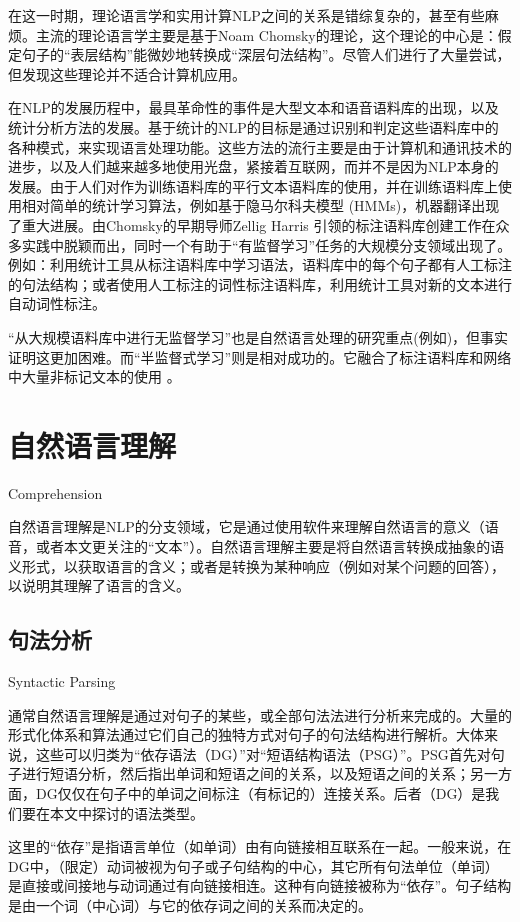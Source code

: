 在这一时期，理论语言学和实用计算NLP之间的关系是错综复杂的，甚至有些麻烦。主流的理论语言学主要是基于Noam Chomsky的理论，这个理论的中心是：假定句子的“表层结构”能微妙地转换成“深层句法结构”。尽管人们进行了大量尝试，但发现这些理论并不适合计算机应用\cite{McCorduck2004}。

在NLP的发展历程中，最具革命性的事件是大型文本和语音语料库的出现，以及统计分析方法的发展。基于统计的NLP的目标是通过识别和判定这些语料库中的各种模式，来实现语言处理功能。这些方法的流行主要是由于计算机和通讯技术的进步，以及人们越来越多地使用光盘，紧接着互联网，而并不是因为NLP本身的发展。由于人们对作为训练语料库的平行文本语料库的使用，并在训练语料库上使用相对简单的统计学习算法，例如基于隐马尔科夫模型 (HMMs)\cite{Hutchins2005}，机器翻译出现了重大进展。由Chomsky的早期导师Zellig Harris \cite{Harris1957}引领的标注语料库创建工作在众多实践中脱颖而出，同时一个有助于“有监督学习”任务的大规模分支领域出现了。例如：利用统计工具从标注语料库中学习语法，语料库中的每个句子都有人工标注的句法结构；或者使用人工标注的词性标注语料库，利用统计工具对新的文本进行自动词性标注。

“从大规模语料库中进行无监督学习”也是自然语言处理的研究重点(例如\cite{Spitkovsky2013})，但事实证明这更加困难。而“半监督式学习”则是相对成功的。它融合了标注语料库和网络中大量非标记文本的使用\cite{Abney2007} \cite{Guo2014}。


\section{自然语言理解}{Comprehension}

自然语言理解是NLP的分支领域，它是通过使用软件来理解自然语言的意义（语音，或者本文更关注的“文本”）。自然语言理解主要是将自然语言转换成抽象的语义形式，以获取语言的含义；或者是转换为某种响应（例如对某个问题的回答），以说明其理解了语言的含义。

\subsection{句法分析}{Syntactic Parsing}

通常自然语言理解是通过对句子的某些，或全部句法法进行分析来完成的。大量的形式化体系和算法通过它们自己的独特方式对句子的句法结构进行解析。大体来说，这些可以归类为“依存语法（DG）”对“短语结构语法（PSG）”。PSG首先对句子进行短语分析，然后指出单词和短语之间的关系，以及短语之间的关系；另一方面，DG仅仅在句子中的单词之间标注（有标记的）连接关系。后者（DG）是我们要在本文中探讨的语法类型。


这里的“依存”是指语言单位（如单词）由有向链接相互联系在一起。一般来说，在DG中，（限定）动词被视为句子或子句结构的中心，其它所有句法单位（单词）是直接或间接地与动词通过有向链接相连。这种有向链接被称为“依存”。句子结构是由一个词（中心词）与它的依存词之间的关系而决定的。


